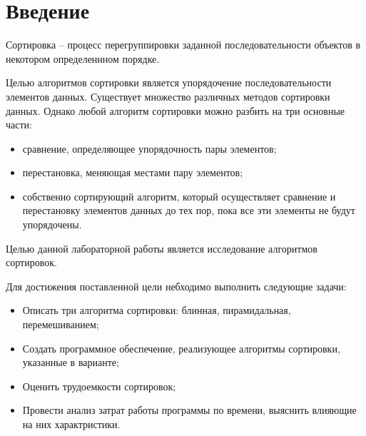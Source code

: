 \chapter*{Введение}

Сортировка -- процесс перегруппировки заданной последовательности объектов в
некотором определеннном порядке.

Целью алгоритмов сортировки является упорядочение последовательности элементов данных. 
Существует множество различных методов сортировки данных. 
Однако любой алгоритм сортировки можно разбить на три основные части:

\begin{itemize}
	\item сравнение, определяющее упорядочность пары элементов;
	\item перестановка, меняющая местами пару элементов;
	\item собственно сортирующий алгоритм, который осуществляет сравнение
	и перестановку элементов данных до тех пор, пока все эти элементы
	не будут упорядочены.
\end{itemize}

Целью данной лабораторной работы является исследование алгоритмов сортировок.

\leavevmode\newline
Для достижения поставленной цели небходимо выполнить следующие задачи:
\begin{itemize}
	\item Описать три алгоритма сортировки: блинная, пирамидальная, перемешиванием;
	\item Создать программное обеспечение, реализующее алгоритмы сортировки, указанные в варианте;
	\item Оценить трудоемкости сортировок;
	\item Провести анализ затрат работы программы по времени, выяснить влияющие на них характристики.
\end{itemize}
